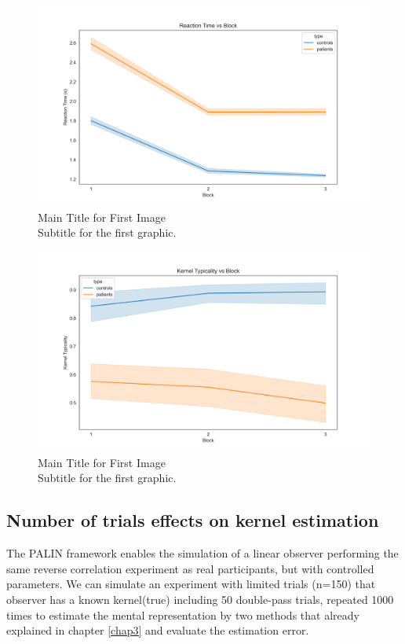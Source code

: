 \begin{figure}[ht!]
    \centering
     \includegraphics[width=15cm]{MainLayout/Images/chapter5/rt_block.jpg}
    \caption{Main Title for First Image \\ \small Subtitle for the first graphic.}
    \label{fig:rt_block}
\end{figure}

\begin{figure}[ht!]
    \centering
    \includegraphics[width=15cm]{MainLayout/Images/chapter5/kernel_typicality_block.jpg}
    \caption{Main Title for First Image \\ \small Subtitle for the first graphic.}
    \label{fig:kernel_typicality_block}
\end{figure}

\subsection{Number of trials effects on kernel estimation}
The PALIN framework enables the simulation of a linear observer performing the same reverse correlation experiment as real participants, but with controlled parameters. We can simulate an experiment with limited trials (n=150) that observer has a known kernel(true) including 50 double-pass trials, repeated 1000 times to estimate the mental representation by two methods that already explained in chapter \ref{chap3} and evaluate the estimation error.


